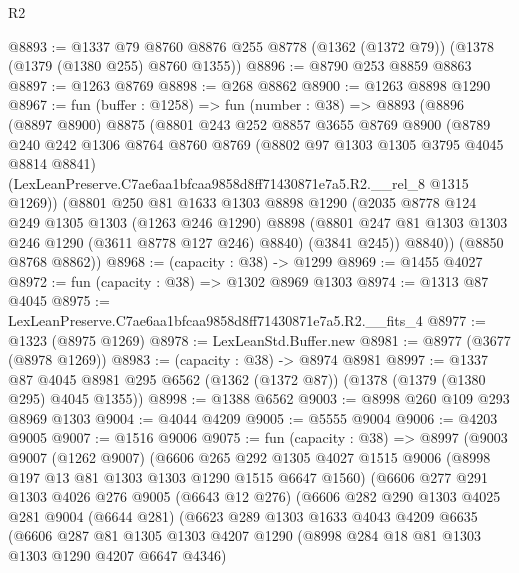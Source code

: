 \begin{lexlean}{R2}
\begin{coremodule}
@8893 := @1337
    @79
    @8760
    @8876
    @255
    @8778
    (@1362 (@1372 @79))
    (@1378 (@1379 (@1380 @255) @8760 @1355))
@8896 := @8790 @253 @8859 @8863
@8897 := @1263 @8769
@8898 := @268 @8862
@8900 := @1263 @8898 @1290
@8967 := fun (buffer : @1258) =>
  fun (number : @38) =>
  @8893
    (@8896
      (@8897 @8900)
      @8875
      (@8801
        @243
        @252
        @8857
        @3655
        @8769
        @8900
        (@8789
          @240
          @242
          @1306
          @8764
          @8760
          @8769
          (@8802 @97 @1303 @1305 @3795 @4045 @8814 @8841)
          (LexLeanPreserve.C7ae6aa1bfcaa9858d8ff71430871e7a5.R2.__rel_8 @1315 @1269))
        (@8801
          @250
          @81
          @1633
          @1303
          @8898
          @1290
          (@2035
            @8778
            @124
            @249
            @1305
            @1303
            (@1263 @246 @1290)
            @8898
            (@8801 @247 @81 @1303 @1303 @246 @1290 (@3611 @8778 @127 @246) @8840)
            (@3841 @245))
          @8840))
      (@8850 @8768 @8862))
@8968 := (capacity : @38) -> @1299
@8969 := @1455 @4027
@8972 := fun (capacity : @38) => @1302 @8969 @1303
@8974 := @1313 @87 @4045
@8975 := LexLeanPreserve.C7ae6aa1bfcaa9858d8ff71430871e7a5.R2.__fits_4
@8977 := @1323 (@8975 @1269)
@8978 := LexLeanStd.Buffer.new
@8981 := @8977 (@3677 (@8978 @1269))
@8983 := (capacity : @38) -> @8974 @8981
@8997 := @1337
    @87
    @4045
    @8981
    @295
    @6562
    (@1362 (@1372 @87))
    (@1378 (@1379 (@1380 @295) @4045 @1355))
@8998 := @1388 @6562
@9003 := @8998 @260 @109 @293 @8969 @1303
@9004 := @4044 @4209
@9005 := @5555 @9004
@9006 := @4203 @9005
@9007 := @1516 @9006
@9075 := fun (capacity : @38) =>
  @8997
    (@9003
      @9007
      (@1262 @9007)
      (@6606
        @265
        @292
        @1305
        @4027
        @1515
        @9006
        (@8998 @197 @13 @81 @1303 @1303 @1290 @1515 @6647 @1560)
        (@6606
          @277
          @291
          @1303
          @4026
          @276
          @9005
          (@6643 @12 @276)
          (@6606
            @282
            @290
            @1303
            @4025
            @281
            @9004
            (@6644 @281)
            (@6623
              @289
              @1303
              @1633
              @4043
              @4209
              @6635
              (@6606
                @287
                @81
                @1305
                @1303
                @4207
                @1290
                (@8998 @284 @18 @81 @1303 @1303 @1290 @4207 @6647 @4346)

\end{coremodule}
\end{lexlean}
